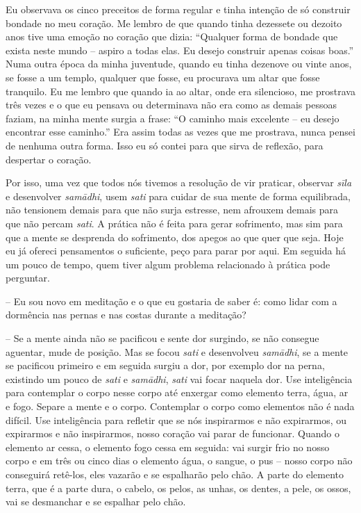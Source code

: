 Eu observava os cinco preceitos de forma regular e tinha intenção de
só construir bondade no meu coração. Me lembro de que quando tinha
dezessete ou dezoito anos tive uma emoção no coração que dizia:
“Qualquer forma de bondade que exista neste mundo – aspiro a todas
elas. Eu desejo construir apenas coisas boas.” Numa outra época da
minha juventude, quando eu tinha dezenove ou vinte anos, se fosse a um
templo, qualquer que fosse, eu procurava um altar que fosse tranquilo.
Eu me lembro que quando ia ao altar, onde era silencioso, me prostrava
três vezes e o que eu pensava ou determinava não era como as demais
pessoas faziam, na minha mente surgia a frase: “O caminho mais
excelente – eu desejo encontrar esse caminho.” Era assim todas as vezes
que me prostrava, nunca pensei de nenhuma outra forma. Isso eu só
contei para que sirva de reflexão, para despertar o coração. 

Por isso, uma vez que todos nós tivemos a resolução de vir praticar,
observar \textit{sīla} e desenvolver \textit{samādhi}, usem
\textit{sati} para cuidar de sua mente de forma equilibrada, não
tensionem demais para que não surja estresse, nem afrouxem demais para
que não percam \textit{sati}. A prática não é feita para gerar
sofrimento, mas sim para que a mente se desprenda do sofrimento, dos
apegos ao que quer que seja. Hoje eu já ofereci pensamentos o
suficiente, peço para parar por aqui. Em seguida há um pouco de tempo,
quem tiver algum problema relacionado à prática pode perguntar.

-- Eu sou novo em meditação e o que eu gostaria de saber é: como
lidar com a dormência nas pernas e nas costas durante a meditação?

-- Se a mente ainda não se pacificou e sente dor surgindo, se não
consegue aguentar, mude de posição. Mas se focou \textit{sati} e
desenvolveu \textit{samādhi}, se a mente se pacificou primeiro e em
seguida surgiu a dor, por exemplo dor na perna, existindo um pouco de
\textit{sati} e \textit{samādhi}, \textit{sati} vai focar naquela
dor. Use inteligência para contemplar o corpo nesse corpo até enxergar
como elemento terra, água, ar e fogo. Separe a mente e o corpo.
Contemplar o corpo como elementos não é nada difícil. Use inteligência
para refletir que se nós inspirarmos e não expirarmos, ou expirarmos e
não inspirarmos, nosso coração vai parar de funcionar. Quando o
elemento ar cessa, o elemento fogo cessa em seguida: vai surgir frio no
nosso corpo e em três ou cinco dias o elemento água, o sangue, o pus –
nosso corpo não conseguirá retê-los, eles vazarão e se espalharão pelo
chão. A parte do elemento terra, que é a parte dura, o cabelo, os
pelos, as unhas, os dentes, a pele, os ossos, vai se desmanchar e se
espalhar pelo chão.

